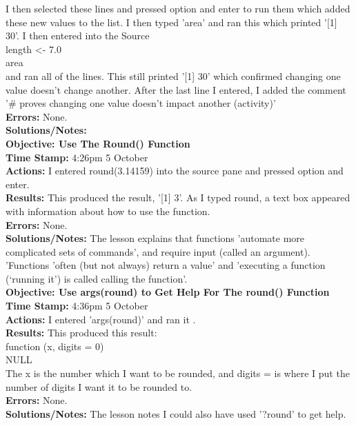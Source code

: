 \documentclass{article}
\begin{document}
\begin{FlushLeft}
I then selected these lines and pressed option and enter to run them which added these new values to the list. I then typed 'area' and ran this which printed '[1] 30'. I then entered into the Source\\
length \textless - 7.0\\
area\\
and ran all of the lines. This still printed '[1] 30' which confirmed changing one value doesn't change another. After the last line I entered, I added the comment '\# proves changing one value doesn't impact another (activity)'\\
\textbf{Errors:} None.\\
\textbf{Solutions/Notes:}\\
\vspace{5mm}
\textbf{Objective: Use The Round() Function}\\ 
\textbf{Time Stamp:} 4:26pm 5 October\\
\textbf{Actions:} I entered round(3.14159) into the source pane and pressed option and enter.\\
\textbf{Results:} This produced the result, '[1] 3'. As I typed round, a text box appeared with information about how to use the function.\\
\textbf{Errors:} None.\\
\textbf{Solutions/Notes:} The lesson explains that functions 'automate more complicated sets of commands', and require input (called an argument). 'Functions 'often (but not always) return a value' and 'executing a function (‘running it’) is called calling the function'.\\
\vspace{5mm}
\textbf{Objective: Use args(round) to Get Help For The round() Function}\\ 
\textbf{Time Stamp:} 4:36pm 5 October\\
\textbf{Actions:} I entered 'args(round)' and ran it .\\
\textbf{Results:} This produced this result:\\
function (x, digits = 0)\\
NULL\\
The x is the number which I want to be rounded, and digits = is where I put the number of digits I want it to be rounded to.\\
\textbf{Errors:} None.\\
\textbf{Solutions/Notes:} The lesson notes I could also have used '?round' to get help.\\
\vspace{5mm}

\end{FlushLeft}
\end{document}
